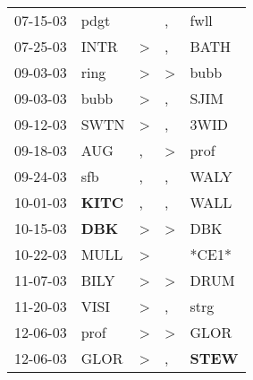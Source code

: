 \begin{supertabular}{p{0.07\textwidth}p{0.06\textwidth}p{0.02\textwidth}p{0.02\textwidth}p{0.06\textwidth}}
          07-15-03\textsuperscript{} &           pdgt\textsuperscript{} &                  &                , &           fwll\textsuperscript{} \\
          07-25-03\textsuperscript{} &           INTR\textsuperscript{} &     \textgreater &                , &           BATH\textsuperscript{} \\
          09-03-03\textsuperscript{} &           ring\textsuperscript{} &     \textgreater &     \textgreater &           bubb\textsuperscript{} \\
          09-03-03\textsuperscript{} &           bubb\textsuperscript{} &     \textgreater &                , &           SJIM\textsuperscript{} \\
          09-12-03\textsuperscript{} &           SWTN\textsuperscript{} &     \textgreater &                , &           3WID\textsuperscript{} \\
          09-18-03\textsuperscript{} &            AUG\textsuperscript{} &                , &     \textgreater &           prof\textsuperscript{} \\
          09-24-03\textsuperscript{} &            sfb\textsuperscript{} &                , &                , &           WALY\textsuperscript{} \\
          10-01-03\textsuperscript{} &  \textbf{KITC\textsuperscript{}} &                , &                , &           WALL\textsuperscript{} \\
          10-15-03\textsuperscript{} &   \textbf{DBK\textsuperscript{}} &     \textgreater &     \textgreater &            DBK\textsuperscript{} \\
          10-22-03\textsuperscript{} &           MULL\textsuperscript{} &     \textgreater &                  &                            *CE1* \\
          11-07-03\textsuperscript{} &           BILY\textsuperscript{} &     \textgreater &     \textgreater &           DRUM\textsuperscript{} \\
          11-20-03\textsuperscript{} &           VISI\textsuperscript{} &     \textgreater &                , &           strg\textsuperscript{} \\
          12-06-03\textsuperscript{} &           prof\textsuperscript{} &     \textgreater &     \textgreater &           GLOR\textsuperscript{} \\
          12-06-03\textsuperscript{} &           GLOR\textsuperscript{} &     \textgreater &                , &  \textbf{STEW\textsuperscript{}} \\

\end{supertabular}
